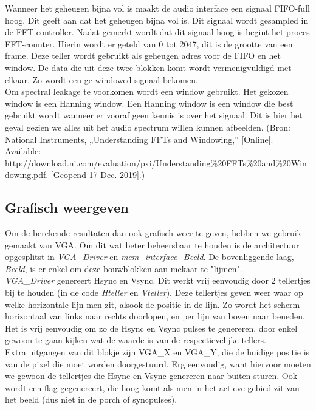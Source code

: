\documentclass[a4paper,kul]{kulakarticle} %
\begin{document}
Wanneer het geheugen bijna vol is maakt de audio interface een signaal FIFO-full hoog. Dit geeft aan dat het geheugen bijna vol is. Dit signaal wordt gesampled in de FFT-controller. Nadat gemerkt wordt dat dit signaal hoog is begint het proces FFT-counter. Hierin wordt er geteld van 0 tot 2047, dit is de grootte van een frame. Deze teller wordt gebruikt als geheugen adres voor de FIFO en het window. De data die uit deze twee blokken komt wordt vermenigvuldigd met elkaar. Zo wordt een ge-windowed signaal bekomen.\\

Om spectral leakage te voorkomen wordt een window gebruikt. Het gekozen window is een Hanning window. Een Hanning window is een window die best gebruikt wordt wanneer er vooraf geen kennis is over het signaal. Dit is hier het geval gezien we alles uit het audio spectrum willen kunnen afbeelden.
(Bron: National Instruments, „Understanding FFTs and Windowing,” [Online]. Available: http://download.ni.com/evaluation/pxi/Understanding\%20FFTs\%20and\%20Windowing.pdf. [Geopend 17 Dec. 2019].)


\subsection{Grafisch weergeven}
Om de berekende resultaten dan ook grafisch weer te geven, hebben we gebruik gemaakt van VGA. Om dit wat beter beheersbaar te houden is de architectuur opgesplitst in \textit{VGA\_Driver} en \textit{mem\_interface\_Beeld}. De bovenliggende laag, \textit{Beeld}, is er enkel om deze bouwblokken aan mekaar te "lijmen".\\

\textit{VGA\_Driver} genereert Hsync en Vsync. Dit werkt vrij eenvoudig door 2 tellertjes bij te houden (in de code \textit{Hteller} en \textit{Vteller}). Deze tellertjes geven weer waar op welke horizontale lijn men zit, alsook de positie in de lijn. Zo wordt het scherm horizontaal van links naar rechts doorlopen, en per lijn van boven naar beneden. Het is vrij eenvoudig om zo de Hsync en Vsync pulses te genereren, door enkel gewoon te gaan kijken wat de waarde is van de respectievelijke tellers.\\
Extra uitgangen van dit blokje zijn VGA\_X en VGA\_Y, die de huidige positie is van de pixel die moet worden doorgestuurd. Erg eenvoudig, want hiervoor moeten we gewoon de tellertjes die Hsync en Vsync genereren naar buiten sturen. Ook wordt een flag gegenereert, die hoog komt als men in het actieve gebied zit van het beeld (dus niet in de porch of syncpulses).\\
\end{document}
